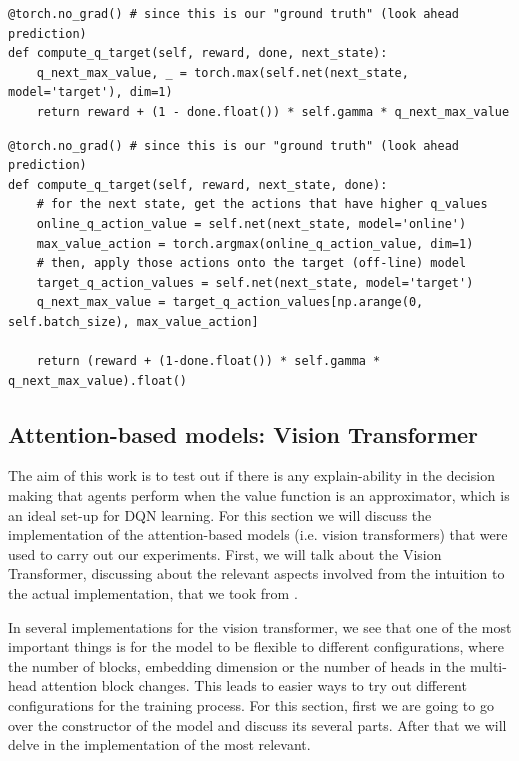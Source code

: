\begin{lstlisting}[caption={DQN action selection algorithm}, label={code:dqn_action_selection}]
@torch.no_grad() # since this is our "ground truth" (look ahead prediction)
def compute_q_target(self, reward, done, next_state):
	q_next_max_value, _ = torch.max(self.net(next_state, model='target'), dim=1)
	return reward + (1 - done.float()) * self.gamma * q_next_max_value
\end{lstlisting}

\begin{lstlisting}[caption={DDQN action selection algorithm}, label={code:ddqn_action_selection}]
@torch.no_grad() # since this is our "ground truth" (look ahead prediction)
def compute_q_target(self, reward, next_state, done):
	# for the next state, get the actions that have higher q_values
	online_q_action_value = self.net(next_state, model='online')
	max_value_action = torch.argmax(online_q_action_value, dim=1)
	# then, apply those actions onto the target (off-line) model
	target_q_action_values = self.net(next_state, model='target')
	q_next_max_value = target_q_action_values[np.arange(0, self.batch_size), max_value_action]
	
	return (reward + (1-done.float()) * self.gamma * q_next_max_value).float()
\end{lstlisting}

\subsection{Attention-based models: Vision Transformer}
\label{sec:vit_transformer_imp}
The aim of this work is to test out if there is any explain-ability in the decision making that agents perform when the value function is an approximator, which is an ideal set-up for DQN learning. For this section we will discuss the implementation of the attention-based models (i.e. vision transformers) that were used to carry out our experiments. First, we will talk about the Vision Transformer, discussing about the relevant aspects involved from the intuition to the actual implementation, that we took from \cite{caron2021emerging}. 

In several implementations for the vision transformer, we see that one of the most important things is for the model to be flexible to different configurations, where the number of blocks, embedding dimension or the number of heads in the multi-head attention block changes. This leads to easier ways to try out different configurations for the training process. For this section, first we are going to go over the constructor of the model and discuss its several parts. After that we will delve in the implementation of the most relevant.

